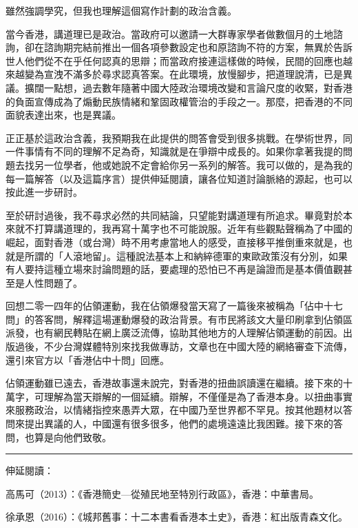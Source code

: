 雖然強調學究，但我也理解這個寫作計劃的政治含義。

當今香港，講道理已是政治。當政府可以邀請一大群專家學者做數個月的土地諮詢，卻在諮詢期完結前推出一個各項參數設定也和原諮詢不符的方案，無異於告訴世人他們從不在乎任何認真的思辯；而當政府接連這樣做的時候，民間的回應也越來越變為宣洩不滿多於尋求認真答案。在此環境，放慢腳步，把道理說清，已是異議。擴闊一點想，過去數年隨著中國大陸政治環境改變和言論尺度的收緊，對香港的負面宣傳成為了煽動民族情緒和鞏固政權管治的手段之一。那麼，把香港的不同面貌表達出來，也是異議。

正正基於這政治含義，我預期我在此提供的問答會受到很多挑戰。在學術世界，同一件事情有不同的理解不足為奇，知識就是在爭辯中成長的。如果你拿著我提的問題去找另一位學者，他或她說不定會給你另一系列的解答。我可以做的，是為我的每一篇解答（以及這篇序言）提供伸延閱讀，讓各位知道討論脈絡的源起，也可以按此進一步研討。

至於研討過後，我不尋求必然的共同結論，只望能對講道理有所追求。畢竟對於本來就不打算講道理的，我再寫十萬字也不可能說服。近年有些觀點聲稱為了中國的崛起，面對香港（或台灣）時不用考慮當地人的感受，直接移平推倒重來就是，也就是所謂的「人滾地留」。這種說法基本上和納綷德軍的東歐政策沒有分別，如果有人要持這種立場來討論問題的話，要處理的恐怕已不再是論證而是基本價值觀甚至是人性問題了。

回想二零一四年的佔領運動，我在佔領爆發當天寫了一篇後來被稱為「佔中十七問」的答客問，解釋這場運動爆發的政治背景。有市民將該文大量印刷拿到佔領區派發，也有網民轉貼在網上廣泛流傳，協助其他地方的人理解佔領運動的前因。出版過後，不少台灣媒體特別來找我做專訪，文章也在中國大陸的網絡審查下流傳，還引來官方以「香港佔中十問」回應。

佔領運動雖已遠去，香港故事還未說完，對香港的扭曲誤讀還在繼續。接下來的十萬字，可理解為當天辯解的一個延續。辯解，不僅僅是為了香港本身。以扭曲事實來服務政治，以情緒指控來愚弄大眾，在中國乃至世界都不罕見。按其他題材以答問來提出異議的人，中國還有很多很多，他們的處境遠遠比我困難。接下來的答問，也算是向他們致敬。

\rule[-10pt]{15cm}{0.05em}

伸延閱讀：

高馬可（2013）：《香港簡史—從殖民地至特別行政區》，香港：中華書局。

徐承恩（2016）：《城邦舊事：十二本書看香港本土史》，香港：紅出版青森文化。